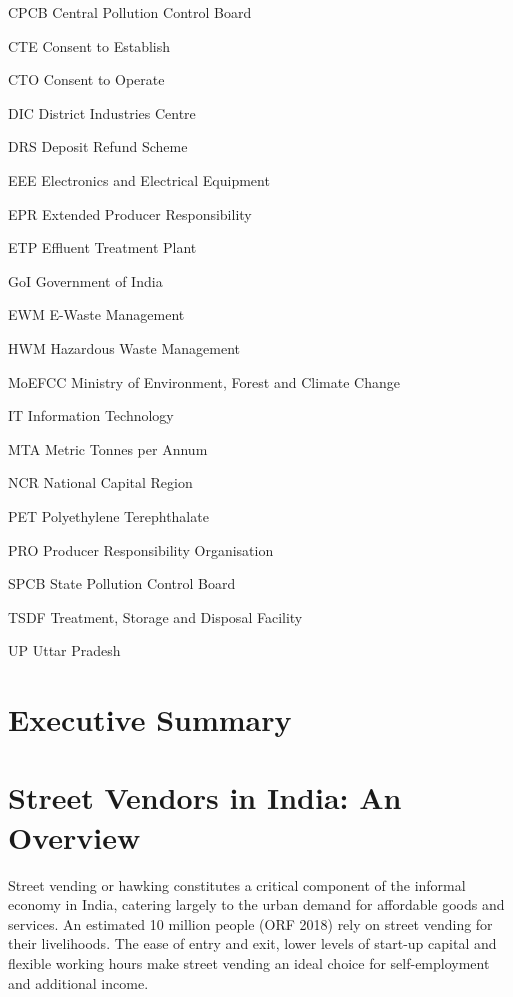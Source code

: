 \documentclass[a4paper, 12pt, twoside]{article}
\begin{document}
\begin{abbrv}
         
        \item[CPCB]			Central Pollution Control Board
        \item[CTE]				Consent to Establish
        \item[CTO]			Consent to Operate
        \item[DIC]				District Industries Centre
        \item[DRS]			Deposit Refund Scheme
        \item[EEE]				Electronics and Electrical Equipment 
        \item[EPR]				Extended Producer Responsibility
        \item[ETP]				Effluent Treatment Plant 
        \item[GoI]				Government of India
        \item[EWM]			E-Waste Management
        \item[HWM]			Hazardous Waste Management
        \item[MoEFCC]			Ministry of Environment, Forest and Climate Change
        \item[IT]				Information Technology 
        \item[MTA]				Metric Tonnes per Annum
        \item[NCR]			National Capital Region
        \item[PET]				Polyethylene Terephthalate
        \item[PRO]			Producer Responsibility Organisation
        \item[SPCB]			State Pollution Control Board
        \item[TSDF]			Treatment, Storage and Disposal Facility
        \item[UP]				Uttar Pradesh
        
\end{abbrv}

\newpage
\section*{Executive Summary}

\newpage
\section{Street Vendors in India: An Overview}
Street vending or hawking constitutes a critical component of the informal economy in India, catering largely to the urban demand for affordable goods and services. An estimated 10 million people (ORF 2018) rely on street vending for their livelihoods. The ease of entry and exit, lower levels of start-up capital and flexible working hours make street vending an ideal choice for self-employment and additional income. 
\end{document}
